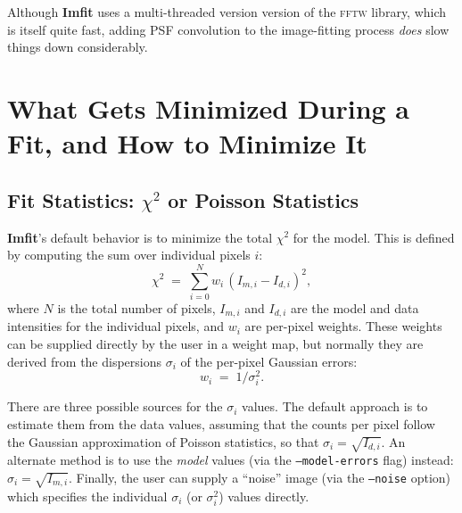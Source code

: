 \documentclass[10pt,a4paper,article]{memoir}
\newcommand{\imfit}{\textbf{Imfit}}
\newcommand{\Imfit}{\textbf{Imfit}}
\newcommand{\chisquare}{\ensuremath{\chi^{2}}}
\begin{document}
Although \imfit{} uses a multi-threaded version version of the \textsc{fftw} library, which
is itself quite fast, adding PSF convolution to the image-fitting process \textit{does}
slow things down considerably.



\chapter{What Gets Minimized During a Fit, and How to Minimize It}

\section{Fit Statistics: \chisquare{} or Poisson Statistics}\label{sec:fit-statistics}

\Imfit's default behavior is to minimize the total \chisquare{} for the model. This
is defined by computing the sum over individual pixels $i$:
\begin{equation}
\chisquare \; = \; \sum_{i = 0}^{N} w_{i} \, (I_{m, i} - I_{d, i})^2 ,
\end{equation}
where $N$ is the total number of pixels, $I_{m, i}$ and $I_{d, i}$ are the model and data intensities
for the individual pixels, and $w_{i}$ are per-pixel weights. These weights can be
supplied directly by the user in a weight map, but normally they are derived from the
dispersions $\sigma_{i}$ of the per-pixel Gaussian errors:
\begin{equation}
w_{i} \; = \; 1/\sigma_{i}^{2} .
\end{equation}

There are three possible sources for the $\sigma_{i}$ values. The
default approach is to estimate them from the data values, assuming that
the counts per pixel follow the Gaussian approximation of Poisson
statistics, so that $\sigma_{i} = \sqrt{I_{d,i}}$. An alternate method
is to use the \textit{model} values (via the \texttt{--model-errors}
flag) instead: $\sigma_{i} = \sqrt{I_{m,i}}$. Finally, the user can
supply a ``noise'' image (via the \texttt{--noise} option) which
specifies the individual $\sigma_{i}$ (or $\sigma_{i}^{2}$) values
directly.
\end{document}
